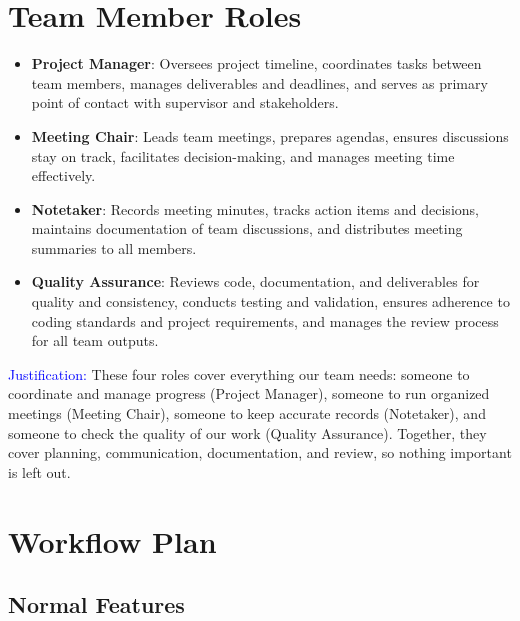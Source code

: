 \documentclass{article}
\begin{document}
\section{Team Member Roles}


\begin{itemize}
  \item \textbf{Project Manager}: Oversees project timeline, coordinates tasks between team members, manages deliverables and deadlines, and serves as primary point of contact with supervisor and stakeholders.
  \item \textbf{Meeting Chair}: Leads team meetings, prepares agendas, ensures discussions stay on track, facilitates decision-making, and manages meeting time effectively.
  \item \textbf{Notetaker}: Records meeting minutes, tracks action items and decisions, maintains documentation of team discussions, and distributes meeting summaries to all members.
  \item \textbf{Quality Assurance}: Reviews code, documentation, and deliverables for quality and consistency, conducts testing and validation, ensures adherence to coding standards and project requirements, and manages the review process for all team outputs.
\end{itemize}

\textcolor{blue}{Justification:} These four roles cover everything our team needs:
someone to coordinate and manage progress (Project Manager), someone to run
organized meetings (Meeting Chair), someone to keep accurate records (Notetaker),
and someone to check the quality of our work (Quality Assurance). Together,
they cover planning, communication, documentation, and review, so nothing
important is left out.

\section{Workflow Plan}

\subsection{Normal Features}
\end{document}
